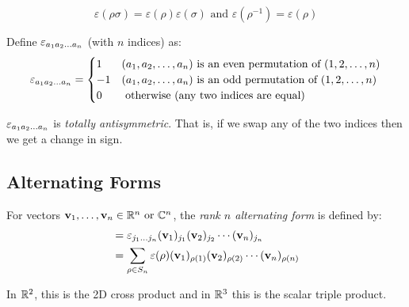\documentclass[../main.tex]{subfiles}
\begin{document}
\begin{remark}
  \[
    \varepsilon(\rho \sigma) = \varepsilon(\rho)\varepsilon(\sigma) \text{ and } \varepsilon(\rho^{-1}) = \varepsilon(\rho)
  \]
\end{remark}
\begin{definition}
Define $\varepsilon_{a_1 a_2 \ldots a_n}$ (with $n$ indices) as:
\[
  \varepsilon_{a_1 a_2 \ldots a_n} = \begin{cases}
  1 & (a_1, a_2, \ldots, a_n) \text{ is an even permutation of }(1, 2, \ldots, n) \\
  -1 & (a_1, a_2, \ldots, a_n) \text{ is an odd permutation of }(1, 2, \ldots, n) \\
  0 & \text{ otherwise (any two indices are equal)}
  \end{cases}
\]
\end{definition}
\begin{remark}[Note]
$\varepsilon_{a_1 a_2 \ldots a_n}$ is \textit{totally antisymmetric}.
That is, if we swap any of the two indices then we get a change in sign.
\end{remark}
\subsection{Alternating Forms}
\begin{definition}
  For vectors $\mathbf{\bm{v}}_1, \ldots, \mathbf{\bm{v}}_n \in \mathbb{R}^{n} \text{ or } \mathbb{C}^{n}$, the \textit{rank $n$ alternating form} is defined by:
  \begin{align*}
    [\vec{v}_1, \ldots, \vec{v}_n] &= \levi_{j_1 \ldots j_n} (\vec{v}_1)_{j_1} (\vec{v}_2)_{j_2} \cdots (\vec{v}_n)_{j_n} \\
                                   &= \sum_{\rho \in S_n}  \varepsilon(\rho) (\vec{v}_1)_{\rho(1)} (\vec{v}_2)_{\rho(2)} \cdots (\vec{v}_n)_{\rho(n)}
  \end{align*}
\end{definition}
\begin{remark}
  In $\mathbb{R}^2$, this is the 2D cross product and in $\mathbb{R}^3$ this is the scalar triple product.
\end{remark}
\end{document}
